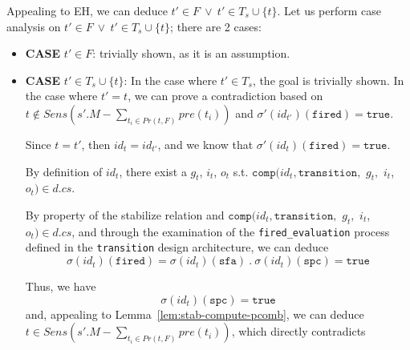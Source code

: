 \documentclass[dvipsnames,12pt]{article}
\begin{document}
\begin{niproof}
\begin{itemize}
\begin{enumerate}
      Appealing to EH, we can deduce $t'\in{}F~\lor~{}t'\in{}T_s\cup\{t\}$.
      Let us perform case analysis on $t'\in{}F~\lor~{}t'\in{}T_s\cup\{t\}$; there are 2 cases:
      \begin{itemize}
      \item \textbf{CASE} $t'\in{}F$: trivially shown, as it is an assumption.
      \item \textbf{CASE} $t'\in{}T_s\cup\{t\}$: In the case where
        $t'\in{}T_s$, the goal is trivially shown. In the case where
        $t'=t$, we can prove a contradiction based on
        $t\notin{}Sens(s'.M-\sum\limits_{t_i\in{}Pr(t,F)}pre(t_i))$
        and $\sigma'(id_{t'})(\texttt{fired})=\mathtt{true}$.

        Since $t=t'$, then $id_t=id_{t'}$, and we know that
        $\sigma'(id_t)(\texttt{fired})=\mathtt{true}$.

        By definition of $id_{t}$, there exist a $g_{t}$, $i_{t}$,
        $o_{t}$ s.t.  $\mathtt{comp}(id_{t},\texttt{transition},$
        $g_{t},$ $i_{t}$, $o_{t})\in{}d.cs$.

        By property of the stabilize relation and
        $\mathtt{comp}(id_{t},\texttt{transition},$ $g_{t},$ $i_{t}$,
        $o_{t})\in{}d.cs$, and through the examination of the
        \texttt{fired_evaluation} process defined in the
        \texttt{transition} design architecture, we can deduce
        \begin{equation*}
          \sigma(id_{t})(\texttt{fired})=\sigma(id_{t})(\texttt{sfa})~.~\sigma(id_{t})(\texttt{spc})=\mathtt{true}
        \end{equation*}
        
        Thus, we have
        \begin{equation*}
          \sigma(id_{t})(\texttt{spc})=\mathtt{true}
        \end{equation*}
        and, appealing to Lemma~\ref{lem:stab-compute-pcomb}, we can
        deduce
        $t\in{}Sens(s'.M-\sum\limits_{t_i\in{}Pr(t,F)}pre(t_i))$,
        which directly contradicts 
      \end{itemize}
    \end{enumerate}
  \end{itemize}
  
\end{niproof}

\end{document}
